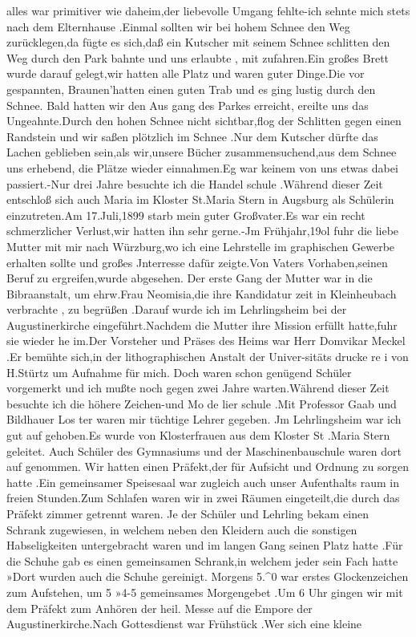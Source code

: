 \documentclass[a4paper,11pt]{article}
\begin{document}
 alles war primitiver wie daheim,der liebevolle Umgang fehlte-ich sehnte mich stets nach dem Elternhause .Einmal sollten wir bei hohem Schnee den Weg zurücklegen,da fügte es sich,daß ein Kutscher mit seinem Schnee schlitten den Weg durch den Park bahnte und uns erlaubte , mit zufahren.Ein großes Brett wurde darauf gelegt,wir hatten alle Platz und waren guter Dinge.Die vor gespannten, Braunen’hatten einen guten Trab und es ging lustig durch den Schnee. Bald hatten wir den Aus gang des Parkes erreicht, ereilte uns das Ungeahnte.Durch den hohen Schnee nicht sichtbar,flog der Schlitten gegen einen Randstein und wir saßen plötzlich im Schnee .Nur dem Kutscher dürfte das Lachen geblieben sein,als wir,unsere Bücher zusammensuchend,aus dem Schnee uns erhebend, die Plätze wieder einnahmen.Eg war keinem von uns etwas dabei passiert.-Nur drei Jahre besuchte ich die Handel schule .Während dieser Zeit entschloß sich auch Maria im Kloster St.Maria Stern in Augsburg als Schülerin einzutreten.Am 17.Juli,1899 starb mein guter Großvater.Es war ein recht schmerzlicher Verlust,wir hatten ihn sehr gerne.-Jm Frühjahr,19ol fuhr die liebe Mutter mit mir nach Würzburg,wo ich eine Lehrstelle im graphischen Gewerbe erhalten sollte und großes Jnterresse dafür zeigte.Von Vaters Vorhaben,seinen Beruf zu ergreifen,wurde abgesehen. Der erste Gang der Mutter war in die Bibraanstalt, um ehrw.Frau Neomisia,die ihre Kandidatur zeit in Kleinheubach verbrachte , zu begrüßen .Darauf wurde ich im Lehrlingsheim bei der Augustinerkirche eingeführt.Nachdem die Mutter ihre Mission erfüllt hatte,fuhr sie wieder he im.Der Vorsteher und Präses des Heims war Herr Domvikar Meckel .Er bemühte sich,in der lithographischen Anstalt der Univer-sitäts drucke re i von H.Stürtz um Aufnahme für mich. Doch waren schon genügend Schüler vorgemerkt und ich mußte noch gegen zwei Jahre warten.Während dieser Zeit besuchte ich die höhere Zeichen-und Mo de lier schule .Mit Professor Gaab und Bildhauer Los ter waren mir tüchtige Lehrer gegeben. Jm Lehrlingsheim war ich gut auf gehoben.Es wurde von Klosterfrauen aus dem Kloster St .Maria Stern geleitet. Auch Schüler des Gymnasiums und der Maschinenbauschule waren dort auf genommen. Wir hatten einen Präfekt,der für Aufsicht und Ordnung zu sorgen hatte .Ein gemeinsamer Speisesaal war zugleich auch unser Aufenthalts raum in freien Stunden.Zum Schlafen waren wir in zwei Räumen eingeteilt,die durch das Präfekt zimmer getrennt waren. Je der Schüler und Lehrling bekam einen Schrank zugewiesen, in welchem neben den Kleidern auch die sonstigen Habseligkeiten untergebracht waren und im langen Gang seinen Platz hatte .Für die Schuhe gab es einen gemeinsamen Schrank,in welchem jeder sein Fach hatte »Dort wurden auch die Schuhe gereinigt. Morgens 5.^0 war erstes Glockenzeichen zum Aufstehen, um 5 »4-5 gemeinsames Morgengebet .Um 6 Uhr gingen wir mit dem Präfekt zum Anhören der heil. Messe auf die Empore der Augustinerkirche.Nach Gottesdienst war Frühstück .Wer sich eine kleine
\end{document}
